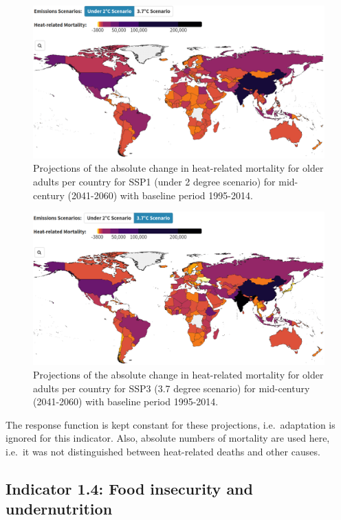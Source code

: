 \documentclass[
]{krantz}
\begin{document}
\begin{figure}
\includegraphics[width=1\linewidth]{work/08-lancet/figures/indicator_2_4} \caption{Projections of the absolute change in heat-related mortality for older adults per country for SSP1 (under 2 degree scenario) for mid-century (2041-2060) with baseline period 1995-2014.}\label{fig:mortality2ssp1strobl}
\end{figure}
\begin{figure}
\includegraphics[width=1\linewidth]{work/08-lancet/figures/indicator_2_5} \caption{Projections of the absolute change in heat-related mortality for older adults per country for SSP3 (3.7 degree scenario) for mid-century (2041-2060) with baseline period 1995-2014.}\label{fig:mortality2ssp3strobl}
\end{figure}

The response function is kept constant for these projections, i.e.~adaptation is ignored for this indicator. Also, absolute numbers of mortality are used here, i.e.~it was not distinguished between heat-related deaths and other causes.

\subsection{Indicator 1.4: Food insecurity and undernutrition}\label{indicator-1.4-food-insecurity-and-undernutrition}
\end{document}
